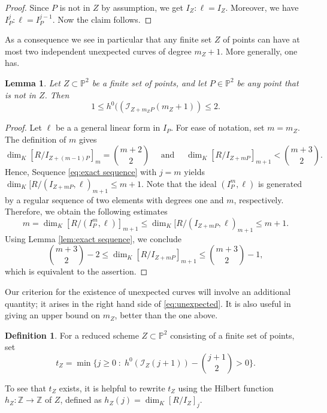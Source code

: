 \documentclass[12pt]{amsart}
\numberwithin{equation}{section}
\newtheorem{lemma}[theorem]{Lemma}
\theoremstyle{definition}
\newtheorem{definition}[theorem]{Definition}
\begin{document}
\begin{proof}
Since $P$ is not in $Z$ by assumption, we get $I_Z : \ell = I_Z$. Moreover, we have $I_P^{j} : \ell = I_P^{j-1}$. Now the claim follows. 
\end{proof}

As a consequence we see in particular that any finite set  $Z$ of points can have at most two  independent unexpected  curves of degree $m_Z + 1$. More generally, one has. 

\begin{lemma} 
   \label{lem:dim estimate}
Let $Z \subset { \ensuremath{\mathbb{P}}}^2$ be a finite set of points, and let $P \in { \ensuremath{\mathbb{P}}}^2$  be any point that is not in $Z$.     
Then 
\[
1 \le h^0((\mathcal I_{Z + m_Z P}(m_Z+1))  \le 2. 
\]
\end{lemma}

\begin{proof} Let $\ell$ be a a general linear form in  $I_P$. 
For ease of notation, set $m = m_Z$. The definition of $m$ gives 
\[
\dim_K [R/I_{Z + (m -1)  P}]_m = \binom{m+2}{2}  \quad \text{ and } \quad  \dim_K [R/I_{Z + m P}]_{m+1} < \binom{m+3}{2}.  
\]
Hence, Sequence \eqref{eq:exact sequence} with $j = m$ yields $\dim_K [R/(I_{Z + m P}, \ell)_{m+1} \le m+1$. Note that the ideal $(I_P^m, \ell)$ is generated by a regular sequence of two elements with degrees one and $m$, respectively. Therefore, we obtain the following estimates
\[
m = \dim_K [R/(I_P^m, \ell)]_{m+1} \le \dim_K [R/(I_{Z + m P}, \ell)_{m+1} \le m+1. 
\]
Using Lemma \ref{lem:exact sequence}, we conclude 
\[
\binom{m+3}{2} -  2 \le \dim_K [R/I_{Z + m P}]_{m+1} \le  \binom{m+3}{2} - 1, 
\]
which is equivalent to the assertion. 
\end{proof}  

Our criterion for the existence of unexpected curves will involve an additional quantity; it arises in 
the right hand side of \eqref{eq:unexpected}. It is also useful in giving
an upper bound on $m_Z$, better than the one above.

\begin{definition}
   \label{def:tZ}
For a reduced scheme $Z \subset { \ensuremath{\mathbb{P}}}^2$ consisting of a finite set of points, set 
\[
t_Z = \min \Big\{j \ge 0 \; : \; h^0(\mathcal I_Z(j+1)) - \binom{j+1}{2} > 0 \Big\}. 
\]
\end{definition} 

To see that $t_Z$ exists, it is helpful to rewrite $t_Z$ using the Hilbert function 
$h_Z: { \ensuremath{\mathbb{Z}}} \to { \ensuremath{\mathbb{Z}}}$ of $Z$, defined as $h_Z (j) = \dim_K [R/I_Z]_j$. 
\end{document}
